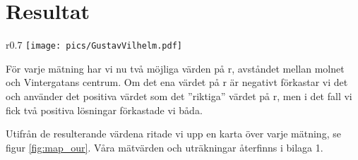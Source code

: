\chapter{Resultat}

\begin{wrapfigure}{r}{0.7\textwidth}
    \centering
    \vspace{-40pt}
    \texttt{[image: pics/GustavVilhelm.pdf]}
    \caption{Vår karta över Vintergatan}
    \label{fig:map_our}
\end{wrapfigure}

För varje mätning har vi nu två möjliga värden på r, avståndet mellan molnet och Vintergatans centrum. Om det ena värdet på r är negativt förkastar vi det och använder det positiva värdet som det ''riktiga'' värdet på r, men i det fall vi fick två positiva lösningar förkastade vi båda.

Utifrån de resulterande värdena ritade vi upp en karta över varje mätning, se figur \ref{fig:map_our}. Våra mätvärden och uträkningar återfinns i bilaga 1.